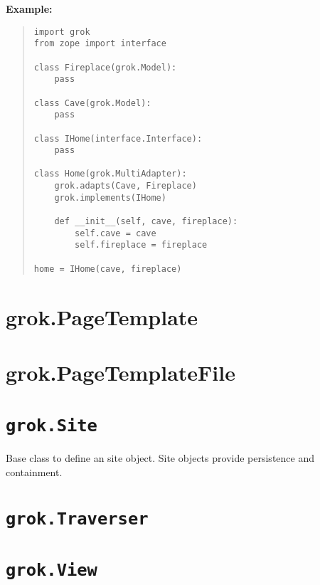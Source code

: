 \documentclass[10pt,a4paper,english]{manual}
\begin{document}
\textbf{Example:}
\begin{quote}\begin{verbatim}
import grok
from zope import interface

class Fireplace(grok.Model):
    pass

class Cave(grok.Model):
    pass

class IHome(interface.Interface):
    pass

class Home(grok.MultiAdapter):
    grok.adapts(Cave, Fireplace)
    grok.implements(IHome)

    def __init__(self, cave, fireplace):
        self.cave = cave
        self.fireplace = fireplace

home = IHome(cave, fireplace)
\end{verbatim}\end{quote}



\section{grok.PageTemplate}



\section{grok.PageTemplateFile}



\section{\texttt{grok.Site}}

Base class to define an site object. Site objects provide persistence and
containment.



\section{\texttt{grok.Traverser}}



\section{\texttt{grok.View}}
\end{document}
